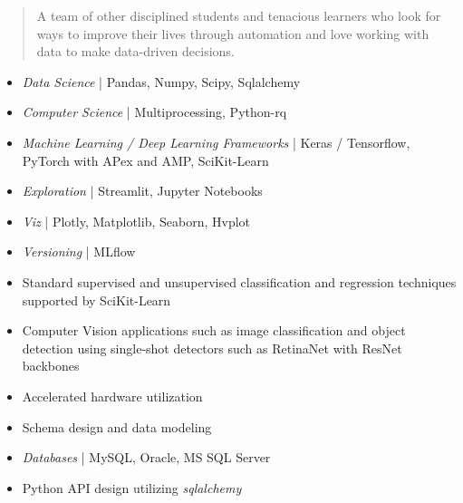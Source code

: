 \begin{quote}
\justify
A team of other disciplined students and tenacious learners who look for ways to improve their lives through automation and love working with data to make data-driven decisions.
\end{quote}


\begin{itemize}
\item \textit{Data Science} | Pandas, Numpy, Scipy, Sqlalchemy
\item \textit{Computer Science} | Multiprocessing, Python-rq
\item \textit{Machine Learning / Deep Learning Frameworks} | Keras / Tensorflow, PyTorch with APex and AMP, SciKit-Learn
\item \textit{Exploration} | Streamlit, Jupyter Notebooks
\item \textit{Viz} | Plotly, Matplotlib, Seaborn, Hvplot
\item \textit{Versioning} | MLflow

\end{itemize}

\begin{itemize}
\item Standard supervised and unsupervised classification and regression techniques supported by SciKit-Learn
\item Computer Vision applications such as image classification and object detection using single-shot detectors such as RetinaNet with ResNet backbones
\item Accelerated hardware utilization

\end{itemize}

\begin{itemize}
\item Schema design and data modeling
\item \textit{Databases} | MySQL, Oracle, MS SQL Server
\item Python API design utilizing \textit{sqlalchemy}

\end{itemize}

